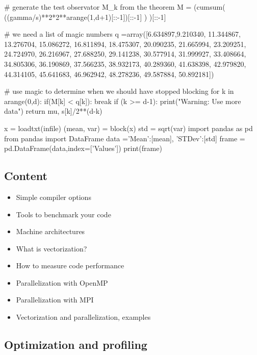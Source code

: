\documentclass[%
oneside,                 %
final,                   %
10pt]{article}
\begin{document}
    # generate the test observator M_k from the theorem
    M = (cumsum( ((gamma/s)**2*2**arange(1,d+1)[::-1])[::-1] )  )[::-1]

    # we need a list of magic numbers
    q =array([6.634897,9.210340, 11.344867, 13.276704, 15.086272, 16.811894, 18.475307, 20.090235, 21.665994, 23.209251, 24.724970, 26.216967, 27.688250, 29.141238, 30.577914, 31.999927, 33.408664, 34.805306, 36.190869, 37.566235, 38.932173, 40.289360, 41.638398, 42.979820, 44.314105, 45.641683, 46.962942, 48.278236, 49.587884, 50.892181])

    # use magic to determine when we should have stopped blocking
    for k in arange(0,d):
        if(M[k] < q[k]):
            break
    if (k >= d-1):
        print("Warning: Use more data")
    return mu, s[k]/2**(d-k)


x = loadtxt(infile)
(mean, var) = block(x) 
std = sqrt(var)
import pandas as pd
from pandas import DataFrame
data ={'Mean':[mean], 'STDev':[std]}
frame = pd.DataFrame(data,index=['Values'])
print(frame)


\epycod


\subsection{Content}
\begin{itemize}
\item Simple compiler options 

\item Tools to benchmark your code

\item Machine architectures

\item What is vectorization?

\item How to measure code performance

\item Parallelization with OpenMP

\item Parallelization with MPI

\item Vectorization and parallelization, examples
\end{itemize}

\noindent
\subsection{Optimization and profiling}
\end{document}
